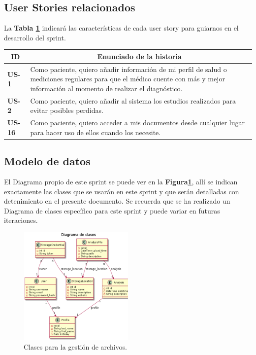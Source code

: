\documentclass[a4paper,12pt]{article}
\begin{document}
\subsection{User Stories relacionados}
La \textbf{Tabla \ref{US-Sprint6} } indicará las características de cada user story para guiarnos en el desarrollo del sprint.
\begin{table}[h]
    \label{US-Sprint6}
    \centering
	\begin{tabular}{|l|p{9cm}|}
	\hline
        \multicolumn{1}{|c|}{\textbf{ID}} &
        \multicolumn{1}{|c|}{\textbf{Enunciado de la historia}} \\          
    \hline
        \textbf{US-1 } & Como paciente, quiero  añadir información de mi perfil de salud o mediciones regulares para que el médico cuente con más y mejor información al momento de realizar el diagnóstico. \\
     \hline 
    \hline
        \textbf{US-2 } & Como paciente, quiero añadir al sistema los estudios realizados para evitar posibles perdidas.\\
     \hline 
     \hline
        \textbf{US-16 } & Como paciente, quiero acceder a mis documentos desde cualquier lugar para hacer uso de ellos cuando los necesite.\\
     \hline   
     
    \end{tabular}
\end{table}

\subsection{Modelo de datos}
El Diagrama propio de este sprint se puede ver en la \textbf{Figura\ref{6-clases_file_upload}}, allí se indican exactamente las clases que se usarán en este sprint y que serán detalladas con detenimiento en el presente documento. Se recuerda que se ha realizado un Diagrama de clases específico para este sprint y puede variar en futuras iteraciones.
    \begin{figure}[h]
        \centering
        \includegraphics[width=0.5\textwidth]{img/dc_file_upload}
        \caption{Clases para la gestión de archivos.}
		\label{6-clases_file_upload}
    \end{figure}
\end{document}
